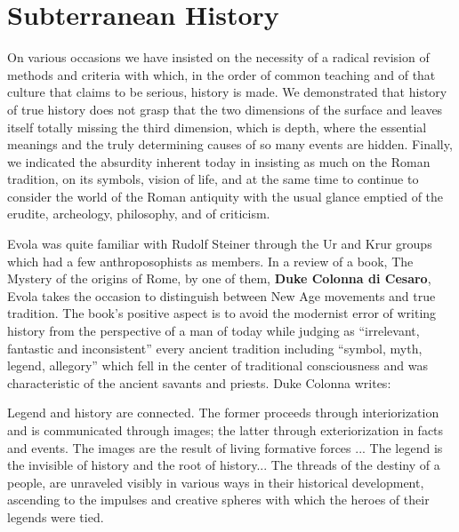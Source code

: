 \section{Subterranean History}

\begin{quotex}
On various occasions we have insisted on the necessity of a radical revision of methods and criteria with which, in the order of common teaching and of that culture that claims to be serious, history is made. We demonstrated that history of true history does not grasp that the two dimensions of the surface and leaves itself totally missing the third dimension, which is depth, where the essential meanings and the truly determining causes of so many events are hidden. Finally, we indicated the absurdity inherent today in insisting as much on the Roman tradition, on its symbols, vision of life, and at the same time to continue to consider the world of the Roman antiquity with the usual glance emptied of the erudite, archeology, philosophy, and of criticism.
\end{quotex}

Evola was quite familiar with Rudolf Steiner through the Ur and Krur groups which had a few anthroposophists as members. In a review of a book, The Mystery of the origins of Rome, by one of them, \textbf{Duke Colonna di Cesaro}, Evola takes the occasion to distinguish between New Age movements and true tradition. The book's positive aspect is to avoid the modernist error of writing history from the perspective of a man of today while judging as ``irrelevant, fantastic and inconsistent'' every ancient tradition including ``symbol, myth, legend, allegory'' which fell in the center of traditional consciousness and was characteristic of the ancient savants and priests. Duke Colonna writes:

\begin{quotex}
Legend and history are connected. The former proceeds through interiorization and is communicated through images; the latter through exteriorization in facts and events. The images are the result of living formative forces ... The legend is the invisible of history and the root of history... The threads of the destiny of a people, are unraveled visibly in various ways in their historical development, ascending to the impulses and creative spheres with which the heroes of their legends were tied.
\end{quotex}


